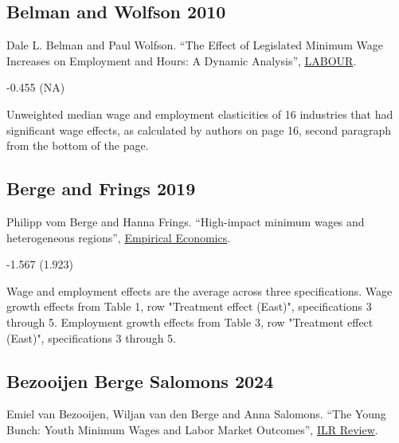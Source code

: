\subsection*{Belman and Wolfson 2010}
\vspace{-0.7em}

\noindent Dale L. Belman and Paul Wolfson. ``The Effect of Legislated Minimum Wage Increases on Employment and Hours: A Dynamic Analysis'', \href{https://doi.org/10.1111/j.1467-9914.2010.00468.x}{LABOUR}.

\vspace{0.7em}

 -0.455 (NA)

\vspace{0.7em}

 Unweighted median wage and employment elasticities of 16 industries that had significant wage effects, as calculated by authors on page 16, second paragraph from the bottom of the page.

\subsection*{Berge and Frings 2019}
\vspace{-0.7em}

\noindent Philipp vom Berge and Hanna Frings. ``High-impact minimum wages and heterogeneous regions'', \href{https://doi.org/10.1007/s00181-019-01661-0}{Empirical Economics}.

\vspace{0.7em}

 -1.567 (1.923)

\vspace{0.7em}

 Wage and employment effects are the average across three specifications. Wage growth effects from Table 1, row "Treatment effect (East)", specifications 3 through 5. Employment growth effects from Table 3, row "Treatment effect (East)", specifications 3 through 5.

\subsection*{Bezooijen Berge Salomons 2024}
\vspace{-0.7em}

\noindent Emiel van Bezooijen, Wiljan van den Berge and Anna Salomons. ``The Young Bunch: Youth Minimum Wages and Labor Market Outcomes'', \href{https://doi.org/10.1177/00197939241239317}{ILR Review}.

